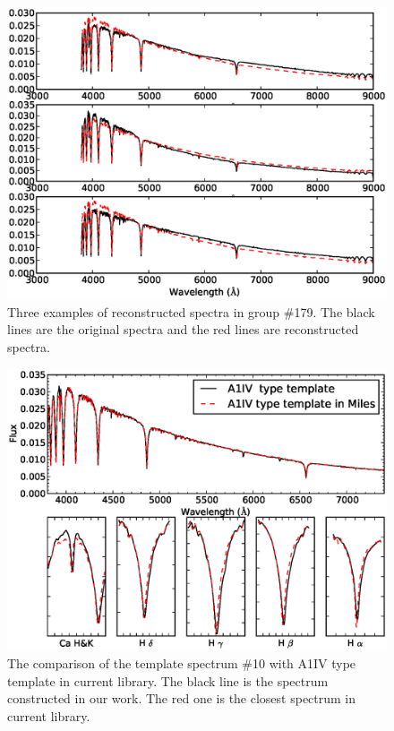 \documentclass[manuscript]{aastex}
\begin{document}
 \begin{figure}
   \centering
   \includegraphics[width=14cm, angle=0,clip]{f82.eps}
   \caption{Three examples of reconstructed spectra in group \#179.
The black lines are the original spectra and the red lines are reconstructed spectra.
   }
   \label{Fig82}
\end{figure}
\begin{figure}
   \centering
   \includegraphics[width=14cm, angle=0,clip]{f92.eps}
   \caption{The comparison of the template spectrum \#10 with  A1IV type template in current library.
The black line is the spectrum constructed in our work.
The red one is the closest spectrum in current library.
   }
   \label{Fig92}
\end{figure}
\end{document}
